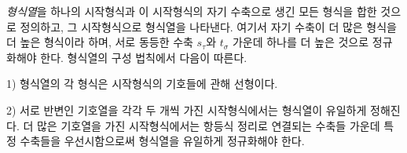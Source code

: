 
\emph{형식열}\setcounter{footnote}{9}을 하나의 시작형식과 이 시작형식의 자기 수축으로 생긴 모든 형식을 합한 것으로 정의하고, 그 시작형식으로 형식열을 나타낸다. 여기서 자기 수축이 더 많은 형식을 \glqq{}더 높은 형식\grqq{}이라 하며, 서로 동등한 수축 $s_\tau$와 $t_\sigma$ 가운데 하나를 더 높은 것으로 정규화해야 한다. 형식열의 구성 법칙에서 다음이 따른다.

1) 형식열의 각 형식은 시작형식의 기호들에 관해 선형이다.

2) 서로 반변인 기호열을 각각 두 개씩 가진 시작형식에서는 형식열이 유일하게 정해진다. 더 많은 기호열을 가진 시작형식에서는 항등식 정리로 연결되는 수축들 가운데 특정 수축들을 우선시함으로써 형식열을 유일하게 정규화해야 한다.

